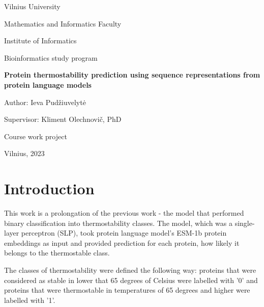 \documentclass[12pt]{article}
\begin{document}
	\begin{center}

	    \vspace*{1cm}
	    \Large
	    Vilnius University

		Mathematics and Informatics Faculty

		Institute of Informatics 

		Bioinformatics study program
	    
        \vspace*{2cm}
        \Large
		\textbf{Protein thermostability prediction using 
		sequence representations from protein 
		language models}

	\end{center}

	\begin{flushright}

		\vspace*{2cm}
        \large
        Author: Ieva Pudžiuvelytė

        Supervisor: Kliment Olechnovič, PhD 
        
	\end{flushright}

	\begin{center}
		\vspace*{4cm}
        \large
        Course work project
        
        \vspace*{2cm}
        \large
        Vilnius, 2023
	\end{center}
	
	\newpage

	\tableofcontents

	\newpage
	
	\section{Introduction}

	This work is a prolongation of the previous work - the model 
	that performed binary classification into thermostability 
	classes. The model, which was a single-layer perceptron (SLP), 
    took protein language model's ESM-1b protein embeddings as input 
	and provided prediction for each protein, how likely it 
	belongs to the thermostable class.

    The classes of thermostability were defined the following 
    way: proteins that were considered as stable in lower that 
    65 degrees of Celsius were labelled with '0' and proteins
    that were thermostable in temperatures of 65 degrees and 
    higher were labelled with '1'. 
    
\end{document}
